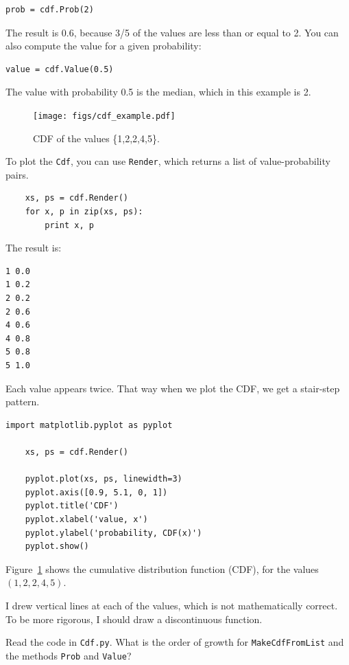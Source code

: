 \documentclass[10pt]{book}
\begin{document}
\begin{verbatim}
prob = cdf.Prob(2)
\end{verbatim}

The result is 0.6, because 3/5 of the values are less than or equal to 2.
You can also compute the value for a given probability:

\begin{verbatim}
value = cdf.Value(0.5)
\end{verbatim}

The value with probability 0.5 is the median, which in this example is 2.

\begin{figure}
\centerline{\texttt{[image: figs/cdf\_example.pdf]}}
\caption{CDF of the values \{1,2,2,4,5\}.\label{fig.cdf}}
\end{figure}

To plot the {\tt Cdf}, you can use {\tt Render}, which returns
a list of value-probability pairs.

\begin{verbatim}
    xs, ps = cdf.Render()
    for x, p in zip(xs, ps):
        print x, p
\end{verbatim}

The result is:

\begin{verbatim}
1 0.0
1 0.2
2 0.2
2 0.6
4 0.6
4 0.8
5 0.8
5 1.0
\end{verbatim}

Each value appears twice.  That way when we plot the
CDF, we get a stair-step pattern.

\begin{verbatim}
import matplotlib.pyplot as pyplot

    xs, ps = cdf.Render()

    pyplot.plot(xs, ps, linewidth=3)
    pyplot.axis([0.9, 5.1, 0, 1])
    pyplot.title('CDF')
    pyplot.xlabel('value, x')
    pyplot.ylabel('probability, CDF(x)')
    pyplot.show()
\end{verbatim}

Figure~\ref{fig.cdf} shows the cumulative distribution
function (CDF), for the values $(1,2,2,4,5)$.

I drew vertical lines at each of the values, which is not
mathematically correct.  To be more rigorous, I should draw
a discontinuous function.

\begin{exercise}

Read the code in {\tt Cdf.py}.  What is the order of growth for
{\tt MakeCdfFromList} and the methods {\tt Prob} and {\tt Value}?
\end{exercise}
\end{document}
